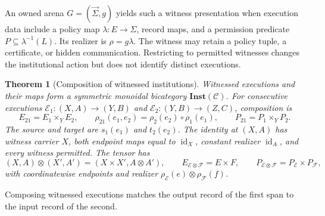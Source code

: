 \documentclass[11pt,a4paper]{article}
\numberwithin{equation}{section}
\newtheorem{theorem}{Theorem}[section]
\theoremstyle{definition}
\theoremstyle{remark}
\theoremstyle{plain}
\begin{document}
An owned arena $G=(\vec\Sigma,g)$ yields such a witness
presentation when execution data include a policy map
$\lambda:E\to\Sigma$, record maps, and a permission predicate
$P\subseteq\lambda^{-1}(L)$. Its realizer is $\rho=g\lambda$.
The witness may retain a policy tuple, a certificate, or hidden
communication. Restricting to permitted witnesses changes the
institutional action but does not identify distinct executions.

\begin{theorem}[Composition of witnessed institutions]
\label{thm:egt-institution-bicategory}
\label{agt-thm-institutions}
Witnessed executions and their maps form a symmetric monoidal
bicategory $\mathbf{Inst}(\mathcal C)$. For consecutive executions
$\mathcal E_1:(X,A)\to(Y,B)$ and
$\mathcal E_2:(Y,B)\to(Z,C)$, composition is
\[
 E_{21}=E_1\times_Y E_2,\qquad
 \rho_{21}(e_1,e_2)=\rho_2(e_2)\circ\rho_1(e_1),\qquad
 P_{21}=P_1\times_Y P_2.
\]
The source and target are $s_1(e_1)$ and $t_2(e_2)$.
The identity at $(X,A)$ has witness carrier $X$, both endpoint
maps equal to $\operatorname{id}_X$, constant realizer
$\operatorname{id}_A$, and every witness permitted.
The tensor has
\[
 (X,A)\otimes(X',A')=(X\times X',A\otimes A'),\qquad
 E_{\mathcal E\otimes\mathcal F}=E\times F,\qquad
 P_{\mathcal E\otimes\mathcal F}=P_{\mathcal E}\times P_{\mathcal F},
\]
with coordinatewise endpoints and realizer
$\rho_{\mathcal E}(e)\otimes\rho_{\mathcal F}(f)$.
\end{theorem}

\noindent Composing witnessed executions matches the output record of the first span to the input record of the second.
\begin{center}
\end{center}
\end{document}
